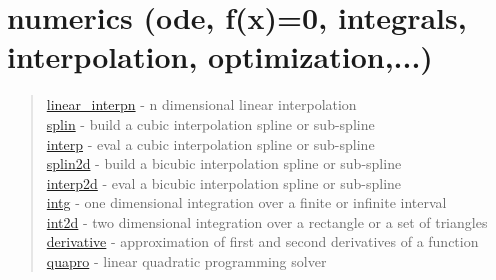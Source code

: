 \chapter*{numerics (ode, f(x)=0, integrals, interpolation,
  optimization,...)}


\begin{quote}
\noindent
\hyperlink{linear_interpn}{linear\_interpn} - n dimensional linear interpolation \\
\hyperlink{splin}{splin} - build a cubic interpolation spline or sub-spline \\
\hyperlink{interp}{interp} - eval a cubic interpolation spline or sub-spline \\
\hyperlink{splin2d}{splin2d} - build a bicubic interpolation spline or sub-spline \\
\hyperlink{interp2d}{interp2d} - eval a bicubic interpolation spline or sub-spline \\
\hyperlink{intg}{intg} - one dimensional integration over a finite or infinite interval \\
\hyperlink{int2d}{int2d} - two dimensional integration over a rectangle or a set of triangles \\
\hyperlink{derivative}{derivative} - approximation of first and second derivatives of a function\\
\hyperlink{quapro}{quapro} - linear quadratic programming solver \\
\end{quote}



  


 
  
 
 
 

